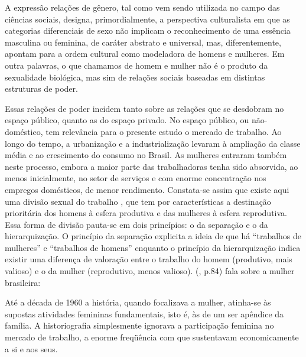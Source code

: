 \begin{citacao}
A expressão relações de gênero, tal como vem sendo utilizada no campo das ciências sociais, designa, primordialmente, a perspectiva culturalista em que as categorias diferenciais de sexo não implicam o reconhecimento de uma essência masculina ou feminina, de caráter abstrato e universal, mas, diferentemente, apontam para a ordem cultural como modeladora de homens e mulheres. Em outra palavras, o que chamamos de homem e mulher não é o produto da sexualidade biológica, mas sim de relações sociais baseadas em distintas estruturas de poder.
\end{citacao}

Essas relações de poder incidem tanto sobre as relações que se desdobram no espaço público, quanto as do espaço privado. No espaço público, ou não-doméstico, tem relevância para o presente estudo o mercado de trabalho. Ao longo do tempo, a urbanização e a industrialização levaram à ampliação da classe média e ao crescimento do consumo no Brasil. As mulheres entraram também neste processo, embora a maior parte das trabalhadoras tenha sido absorvida, ao menos inicialmente, no setor de serviços e com enorme concentração nos empregos domésticos, de menor rendimento. Constata-se assim que existe aqui uma divisão sexual do trabalho \cite{KERGOAT2004}, que tem por características a destinação prioritária dos homens à esfera produtiva e das mulheres à esfera reprodutiva. Essa forma de divisão pauta-se em dois princípios: o da separação e o da hierarquização. O princípio da separação explicita a ideia de que há ``trabalhos de mulheres'' e ``trabalhos de homens'' enquanto o princípio da hierarquização indica existir uma diferença de valoração entre o trabalho do homem (produtivo, mais valioso) e o da mulher (reprodutivo, menos valioso).  (\citeyear{BLAY2001}, p.84) fala sobre a mulher brasileira:

\begin{citacao}
Até a década de 1960 a história, quando focalizava a mulher, atinha-se às supostas atividades femininas fundamentais, isto é, às de um ser apêndice da família. A historiografia simplesmente ignorava a participação feminina no mercado de trabalho, a enorme freqüência com que sustentavam economicamente a si e aos seus.
\end{citacao}

